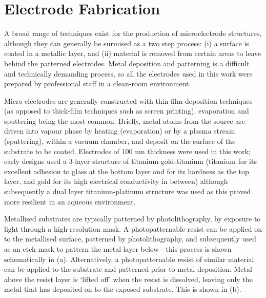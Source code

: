 \section{Electrode Fabrication}
\label{Section:Electrode_fabrication}
A broad range of techniques exist for the production of microelectrode structures, although they can generally be surmised as a two step process: (i) a surface is coated in a metallic layer, and (ii) material is removed from certain areas to leave behind the patterned electrodes. Metal deposition and patterning is a difficult and technically demanding process, so all the electrodes used in this work were prepared by professional staff in a clean-room environment.

Micro-electrodes are generally constructed with thin-film deposition techniques (as opposed to thick-film techniques such as screen printing), evaporation and sputtering being the most common. Briefly, metal atoms from the source are driven into vapour phase by heating (evaporation) or by a plasma stream (sputtering), within a vacuum chamber, and deposit on the surface of the substrate to be coated. Electrodes of 100 nm thickness were used in this work; early designs used a 3-layer structure of titanium-gold-titanium (titanium for its excellent adhesion to glass at the bottom layer and for its hardness as the top layer, and gold for its high electrical conductivity in between) although subsequently a dual layer titanium-platinum structure was used as this proved more resilient in an aqueous environment.

Metallised substrates are typically patterned by photolithography, by exposure to light through a high-resolution mask. A photopatternable resist can be applied on to the metallised surface, patterned by photolithography, and subsequently used as an etch mask to pattern the metal layer below - this process is shown schematically in  (a). Alternatively, a photopatternable resist of similar material can be applied to the substrate and patterned prior to metal deposition. Metal above the resist layer is `lifted off' when the resist is dissolved, leaving only the metal that has deposited on to the exposed substrate. This is shown in  (b).

